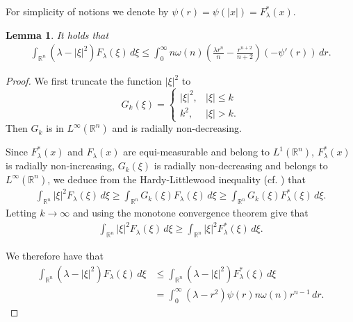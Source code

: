 \documentclass[11pt,twoside, leqno]{article}
\def\rr{{\mathbb R}}
\def\rn{{{\rr}^n}}
\newtheorem{lem}[thm]{Lemma}
\numberwithin{equation}{section}
\begin{document}
For simplicity of notions we denote by  $\psi(r)=\psi(|x|)=F_\lambda^\ast(x)$.
\begin{lem}\label{lem-2}
It holds that
\begin{align*}
\int_{\rn}(\lambda-|\xi|^2)F_\lambda(\xi)\,d\xi\le
\int_0^\infty n\omega(n) \left(\frac{\lambda r^n}{n} -\frac{r^{n+2}}{n+2}\right) (-\psi'(r))\,dr.
\end{align*}
\end{lem}
\begin{proof}
We first truncate the function $|\xi|^2$
to
$$
G_k(\xi)=
\begin{cases} |\xi|^2, & |\xi|\le k\\
k^2, & |\xi|>k.
\end{cases}
$$
Then $G_k$ is in $L^\infty(\rn)$ and is radially non-decreasing.

Since $F_\lambda^\ast(x)$ and $F_\lambda(x)$ are equi-measurable and belong to $L^1(\rn)$, $F_\lambda^\ast(x)$ is radially non-increasing, $G_k(\xi)$ is radially non-decreasing and belongs to $L^\infty(\rn)$, we deduce from
the Hardy-Littlewood inequality (cf. \cite[Corollary 1.4.1]{Kesa06}) that
\begin{align*}
\int_{\rn}|\xi|^2F_\lambda(\xi)\,d\xi\ge \int_{\rn}G_k(\xi)F_\lambda(\xi)\,d\xi\ge \int_{\rn}G_k(\xi)F_\lambda^\ast(\xi)\,d\xi.
\end{align*}
Letting $k\to \infty$ and using the monotone convergence theorem give that
\begin{align*}
\int_{\rn}|\xi|^2F_\lambda(\xi)\,d\xi\ge \int_{\rn}|\xi|^2F_\lambda^\ast(\xi)\,d\xi.
\end{align*}

We therefore have that
\begin{align}\label{e2.6}
\int_{\rn}(\lambda-|\xi|^2)F_\lambda(\xi)\,d\xi&\le \int_{\rn}(\lambda-|\xi|^2)F_\lambda^\ast(\xi)\,d\xi\nonumber\\
&=\int_{0}^\infty(\lambda-r^2)\psi(r)n\omega(n)r^{n-1}\,dr.
\end{align}


\end{proof}
\end{document}
